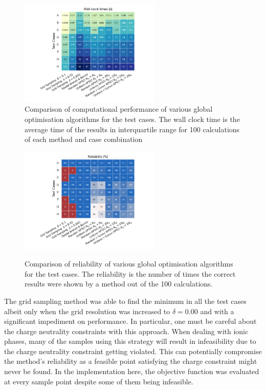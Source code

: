\begin{figure}
     \centering
     \includegraphics[width=0.6\textwidth]{figures/chapter-6/time.pdf}
     \caption[Comparison of computational performance of different global optimisation algorithms.]{Comparison of computational performance of various global optimisation algorithms for the test cases. The wall clock time is the average time of the results in interquartile range for 100 calculations of each method and case combination}
     \label{fig:res_time}
 \end{figure}



\begin{figure}
         \centering
         \includegraphics[width=0.6\textwidth]{figures/chapter-6/reliability.pdf}
         \label{fig:res_rel}
     	\caption[Comparison of reliability of different global optimisation algorithms.]{Comparison of reliability of various global optimisation algorithms for the test cases. The reliability is the number of times the correct results were shown by a method out of the 100 calculations.}
 \end{figure}
 
The grid sampling method was able to find the minimum in all the test cases albeit only when the grid resolution was increased to $\delta = 0.00$ and with a significant impediment on performance. In particular, one must be careful about the charge neutrality constraints with this approach. When dealing with ionic phases, many of the samples using this strategy will result in infeasibility due to the charge neutrality constraint getting violated. This can potentially compromise the method's reliability as a feasible point satisfying the charge constraint might never be found. In the implementation here, the objective function was evaluated at every sample point despite some of them being infeasible.

